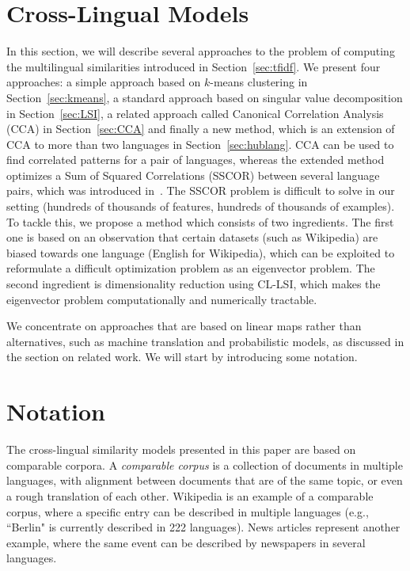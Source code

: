 \section{Cross-Lingual Models}\label{sec:models}
In this section, we will describe several approaches to the problem of computing the 
multilingual similarities introduced in Section~\ref{sec:tfidf}. We present four approaches:
a simple approach based on $k$-means clustering in Section~\ref{sec:kmeans}, a standard approach 
based on singular value decomposition in Section~\ref{sec:LSI}, a related
approach called Canonical Correlation Analysis (CCA) in Section~\ref{sec:CCA} and finally a 
new method, which is an extension of CCA to more than two languages in Section~\ref{sec:hublang}.
%
CCA can be used to find correlated patterns for a pair of languages, whereas the extended method 
optimizes a Sum of Squared Correlations (SSCOR) between several language pairs, which was introduced 
in~\cite{Kettenring}. The SSCOR problem is difficult to solve in our setting (hundreds of thousands 
of features, hundreds of thousands of examples). To tackle this, we propose a method which consists 
of two ingredients. The first one is based on an observation that certain datasets (such as Wikipedia) 
are biased towards one language (English for Wikipedia), which can be exploited to reformulate a 
difficult optimization problem as an eigenvector problem. The second ingredient is dimensionality 
reduction using CL-LSI, which makes the eigenvector problem computationally and numerically tractable.

We concentrate on approaches that are based on linear maps rather than alternatives, such as machine translation and probabilistic models, as discussed in the section on related work. We will start by introducing some notation.

\section{Notation}\label{sec:notation}

The cross-lingual similarity models presented in this paper are based on comparable corpora. 
A \emph{comparable corpus} is a collection of documents in multiple languages, with alignment 
between documents that are of the same topic, or even a rough translation of each other. 
Wikipedia is an example of a comparable corpus, where a specific entry can be described in multiple 
languages (e.g., ``Berlin" is currently described in 222 languages). News articles represent 
another example, where the same event can be described by newspapers in several languages.

